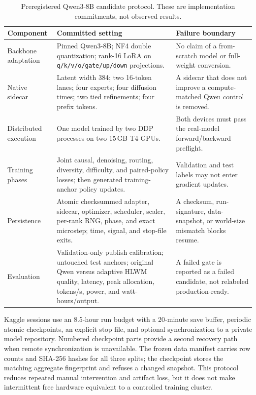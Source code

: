 \documentclass[10pt,a4paper]{article}
\begin{document}
\begin{table}[htbp]
\caption{Preregistered Qwen3-8B candidate protocol. These are implementation
commitments, not observed results.}
\label{tab:8b}
\centering\footnotesize
\begin{tabularx}{\textwidth}{@{}>{\raggedright\arraybackslash}p{}XX@{}}
\toprule
\textbf{Component} & \textbf{Committed setting} & \textbf{Failure boundary} \\
\midrule
Backbone adaptation & Pinned Qwen3-8B; NF4 double quantization; rank-16 LoRA on \texttt{q/k/v/o/gate/up/down} projections. & No claim of a from-scratch model or full-weight conversion. \\
Native sidecar & Latent width 384; two 16-token lanes; four experts; four diffusion times; two tied refinements; four prefix tokens. & A sidecar that does not improve a compute-matched Qwen control is removed. \\
Distributed execution & One model trained by two DDP processes on two 15\,GB T4 GPUs. & Both devices must pass the real-model forward/backward preflight. \\
Training phases & Joint causal, denoising, routing, diversity, difficulty, and paired-policy losses; then generated training-anchor policy updates. & Validation and test labels may not enter gradient updates. \\
Persistence & Atomic checksummed adapter, sidecar, optimizer, scheduler, scaler, per-rank RNG, phase, and exact microstep; time, signal, and stop-file exits. & A checksum, run-signature, data-snapshot, or world-size mismatch blocks resume. \\
Evaluation & Validation-only publish calibration; untouched test anchors; original Qwen versus adaptive HLWM quality, latency, peak allocation, tokens/s, power, and watt-hours/output. & A failed gate is reported as a failed candidate, not relabeled production-ready. \\
\bottomrule
\end{tabularx}
\end{table}

Kaggle sessions use an 8.5-hour run budget with a 20-minute save buffer,
periodic atomic checkpoints, an explicit stop file, and optional
synchronization to a private model repository. Numbered checkpoint parts
provide a second recovery path when remote synchronization is unavailable.
The frozen data manifest carries row counts and SHA-256 hashes for all three
splits; the checkpoint stores the matching aggregate fingerprint and refuses
a changed snapshot. This protocol reduces repeated manual intervention and
artifact loss, but it does not make intermittent free hardware equivalent to
a controlled training cluster.
\end{document}
